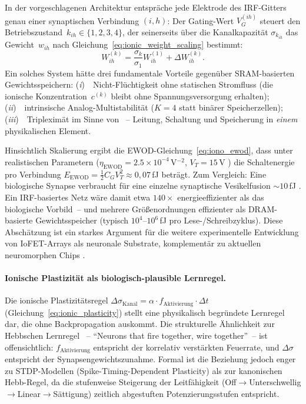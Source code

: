 ﻿\documentclass[12pt, a4paper, openany]{report}
\begin{document}
In der vorgeschlagenen Architektur entspräche jede Elektrode des
IRF-Gitters genau einer synaptischen Verbindung $(i, h)$: Der Gating-Wert
$V_G^{(ih)}$ steuert den Betriebszustand~$k_{ih} \in \{1,2,3,4\}$, der
seinerseits über die Kanalkapazität $\sigma_{k_{ih}}$ das Gewicht~$w_{ih}$
nach Gleichung~\ref{eq:ionic_weight_scaling} bestimmt:
\begin{equation}
  W^{(k)}_{ih} = \frac{\sigma_{k}}{\sigma_1} W^{(1)}_{ih} + \Delta W^{(k)}_{ih}.
  \label{eq:outlook_weight_irf}
\end{equation}
Ein solches System hätte drei fundamentale Vorteile gegenüber
SRAM-basierten Gewichtsspeichern: (\emph{i})~~Nicht-Flüchtigkeit ohne
statischen Stromfluss (die ionische Konzentration~$c^{(k)}$ bleibt ohne
Spannungsversorgung erhalten); (\emph{ii})~~intrinsische Analog-Multistabilität
($K=4$ statt binärer Speicherzellen); (\emph{iii})~~Tripleximät im Sinne von
\citeauthor{epp2026iono}~-- Leitung, Schaltung und Speicherung in \textit{einem}
physikalischen Element.

Hinsichtlich Skalierung ergibt die EWOD-Gleichung~\ref{eq:iono_ewod}, dass
unter realistischen Parametern ($\eta_{\text{EWOD}} = 2.5\times10^{-4}$\,V$^{-2}$,
$V_T = 15$\,V \cite{epp2026iono}) die Schaltenergie pro Verbindung
$E_{\text{EWOD}} = \frac{1}{2} C_G V_T^2 \approx 0{,}07$\,fJ beträgt.
Zum Vergleich: Eine biologische Synapse verbraucht für eine einzelne
synaptische Vesikelfusion $\sim\!10$\,fJ \cite{laughlin03}.  Ein IRF-basiertes
Netz wäre damit etwa $140\times$ energieeffizienter als das
biologische Vorbild~-- und mehrere Größenordnungen effizienter als
DRAM-basierte Gewichtsspeicher (typisch $10^4$--$10^6$\,fJ pro
Lese-/Schreibzyklus).  Diese Abschätzung ist ein starkes Argument für die
weitere experimentelle Ent\-wick\-lung von IoFET-Arrays als neuronale Substrate,
komplementär zu aktuellen neuromorphen Chips \cite{schuman17}.

\paragraph{Ionische Plastizität als biologisch-plausible Lernregel.}
Die ionische Plastizitätsregel
$\Delta\sigma_{\text{Kanal}} = \alpha \cdot f_{\text{Aktivierung}} \cdot \Delta t$
(Gleichung~\ref{eq:ionic_plasticity}) stellt eine physikalisch begründete
Lernregel dar, die ohne Backpropagation auskommt.  Die strukturelle Ähnlichkeit
zur Hebbschen Lernregel \cite{hebb49}~-- ``Neurons that fire together, wire
together''~-- ist offensichtlich: $f_{\text{Aktivierung}}$ entspricht der
korrelativ verstärkten Feuerrate, und $\Delta\sigma$ entspricht der
Synapsengewichts\-zunahme.  Formal ist die Beziehung jedoch enger zu
STDP-Modellen (Spike-Timing-Dependent Plasticity) als zur kanonischen
Hebb-Regel, da die stufenweise Steigerung der Leitfähigkeit (Off$\to$Unterschwellig$\to$Linear$\to$Sättigung) zeitlich
abgestuften Potenzierungsstufen entspricht.
\end{document}
